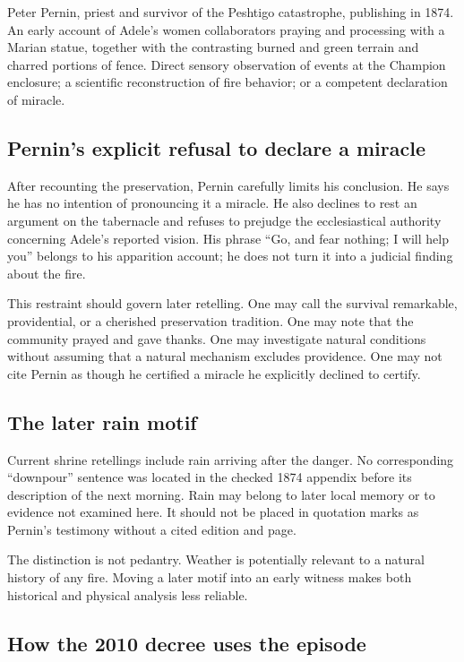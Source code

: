 \sourceboundary
  {Peter Pernin, priest and survivor of the Peshtigo catastrophe, publishing in 1874.}
  {An early account of Adele's women collaborators praying and processing with a Marian statue, together with the contrasting burned and green terrain and charred portions of fence.}
  {Direct sensory observation of events at the Champion enclosure; a scientific reconstruction of fire behavior; or a competent declaration of miracle.}

\subsection{Pernin's explicit refusal to declare a miracle}

After recounting the preservation, Pernin carefully limits his conclusion. He says he has no intention of pronouncing it a miracle. He also declines to rest an argument on the tabernacle and refuses to prejudge the ecclesiastical authority concerning Adele's reported vision. His phrase “Go, and fear nothing; I will help you” belongs to his apparition account; he does not turn it into a judicial finding about the fire.

This restraint should govern later retelling. One may call the survival remarkable, providential, or a cherished preservation tradition. One may note that the community prayed and gave thanks. One may investigate natural conditions without assuming that a natural mechanism excludes providence. One may not cite Pernin as though he certified a miracle he explicitly declined to certify.

\subsection{The later rain motif}

Current shrine retellings include rain arriving after the danger. No corresponding “downpour” sentence was located in the checked 1874 appendix before its description of the next morning. Rain may belong to later local memory or to evidence not examined here. It should not be placed in quotation marks as Pernin's testimony without a cited edition and page.

The distinction is not pedantry. Weather is potentially relevant to a natural history of any fire. Moving a later motif into an early witness makes both historical and physical analysis less reliable.

\subsection{How the 2010 decree uses the episode}

